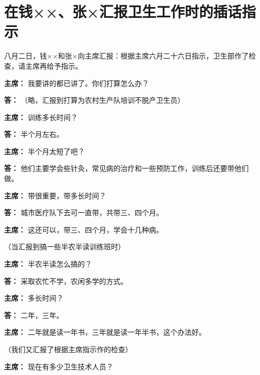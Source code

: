 \section[在钱××、张×汇报卫生工作时的插话指示（一九六五年八月二日）]{在钱××、张×汇报卫生工作时的插话指示}


八月二日，钱××和张×向主席汇报：根据主席六月二十六日指示，卫生部作了检查，请主席再给予指示。

\begin{duihua}

\item[\textbf{主席：}] 我要讲的都已讲了。你们打算怎么办？

\item[\textbf{答：}] （略，汇报到打算为农村生产队培训不脱产卫生员）

\item[\textbf{主席：}] 训练多长时间？

\item[\textbf{答：}] 半个月左右。

\item[\textbf{主席：}] 半个月太短了吧？

\item[\textbf{答：}] 他们主要学会些针灸，常见病的治疗和一些预防工作，训练后还要带他们做。

\item[\textbf{主席：}] 带很重要，带多长时间？

\item[\textbf{答：}] 城市医疗队下去可一直带，共带三、四个月。

\item[\textbf{主席：}] 这还可以，带三、四个月，学会十几种病。

（当汇报到搞一些半农半读训练班时）

\item[\textbf{主席：}] 半农半读怎么搞的？

\item[\textbf{答：}] 采取农忙不学，农闲多学的方式。

\item[\textbf{主席：}] 多长时间？

\item[\textbf{答：}] 二年，三年。

\item[\textbf{主席：}] 二年就是读一年书，三年就是读一年半书，这个办法好。

（我们又汇报了根据主席指示作的检查）

\item[\textbf{主席：}] 现在有多少卫生技术人员？


\end{duihua}
